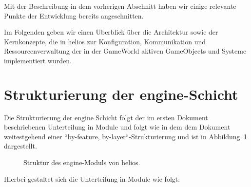 

Mit der Beschreibung in dem vorherigen Abschnitt haben wir einige relevante Punkte der Entwicklung bereits angeschnitten.

Im Folgenden geben wir einen Überblick über die Architektur sowie der Kernkonzepte, die in helios zur Konfiguration, Kommunikation und Ressourcenverwaltung der in der GameWorld aktiven GameObjects und Systeme implementiert wurden.

\section{Strukturierung der engine-Schicht}

Die Strukturierung der engine Schicht folgt der im ersten Dokument beschriebenen Unterteilung in Module und folgt wie in dem dem Dokument weitestgehend einer ``by-feature, by-layer``-Strukturierung und ist in Abbildung~\ref{fig:engine_struktur} dargestellt.

\begin{figure}[htbp]
    \setlength{\DTbaselineskip}{18pt}
    \caption{Struktur des engine-Moduls von helios.}
    \label{fig:engine_struktur}
\end{figure}

Hierbei gestaltet sich die Unterteilung in Module wie folgt:

